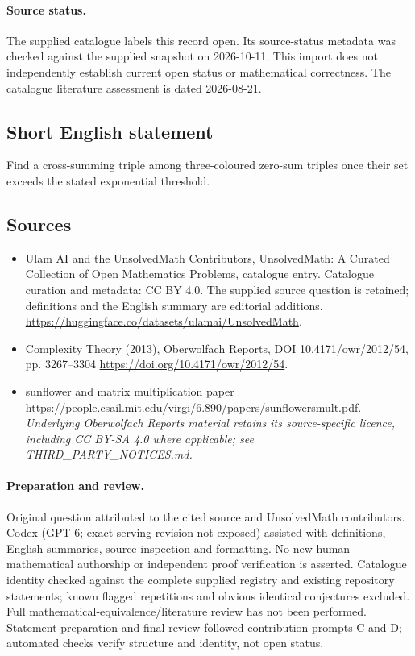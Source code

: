 \documentclass[11pt]{article}
\begin{document}
\paragraph{Source status.}
The supplied catalogue labels this record open. Its source-status metadata was checked against the supplied snapshot on 2026-10-11. This import does not independently establish current open status or mathematical correctness. The catalogue literature assessment is dated 2026-08-21.
\subsection{Short English statement}
Find a cross-summing triple among three-coloured zero-sum triples once their set exceeds the stated exponential threshold.
\subsection{Sources}
\begin{itemize}
\item[S1] Ulam AI and the UnsolvedMath Contributors, UnsolvedMath: A Curated Collection of Open Mathematics Problems, catalogue entry. Catalogue curation and metadata: CC BY 4.0. The supplied source question is retained; definitions and the English summary are editorial additions.
\url{https://huggingface.co/datasets/ulamai/UnsolvedMath}.
\item[S2] Complexity Theory (2013), Oberwolfach Reports, DOI 10.4171/owr/2012/54, pp. 3267--3304
\url{https://doi.org/10.4171/owr/2012/54}.
\item[S3] sunflower and matrix multiplication paper
\url{https://people.csail.mit.edu/virgi/6.890/papers/sunflowersmult.pdf}.
\textit{Underlying Oberwolfach Reports material retains its source-specific licence, including CC BY-SA 4.0 where applicable; see THIRD\_PARTY\_NOTICES.md.}
\end{itemize}
\paragraph{Preparation and review.}
Original question attributed to the cited source and UnsolvedMath contributors. Codex (GPT-6; exact serving revision not exposed) assisted with definitions, English summaries, source inspection and formatting. No new human mathematical authorship or independent proof verification is asserted. Catalogue identity checked against the complete supplied registry and existing repository statements; known flagged repetitions and obvious identical conjectures excluded. Full mathematical-equivalence/literature review has not been performed. Statement preparation and final review followed contribution prompts C and D; automated checks verify structure and identity, not open status.
\label{end:statement}
\end{document}
